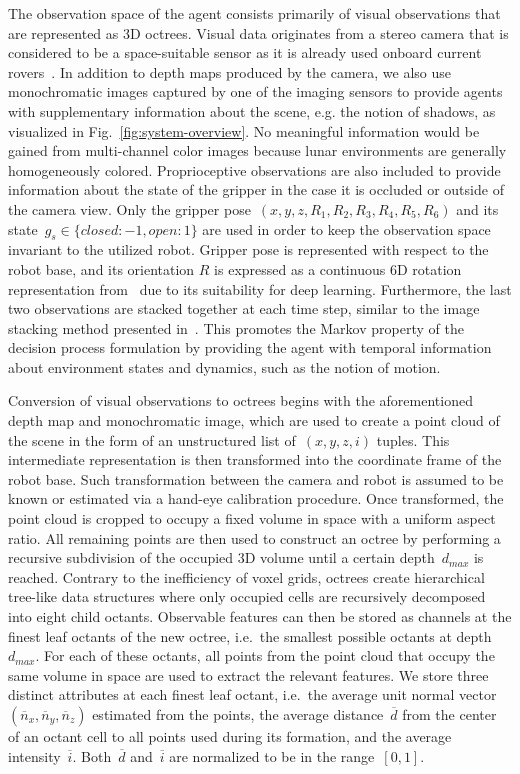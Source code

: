 The observation space of the agent consists primarily of visual observations that are represented as 3D octrees. Visual data originates from a stereo camera that is considered to be a space-suitable sensor as it is already used onboard current rovers~\cite{grotzinger_mars_2012}. In addition to depth maps produced by the camera, we also use monochromatic images captured by one of the imaging sensors to provide agents with supplementary information about the scene, e.g. the notion of shadows, as visualized in Fig.~\ref{fig:system-overview}. No meaningful information would be gained from multi-channel color images because lunar environments are generally homogeneously colored. Proprioceptive observations are also included to provide information about the state of the gripper in the case it is occluded or outside of the camera view. Only the gripper pose~\mbox{\((x,y,z,R_{1},R_{2},R_{3},R_{4},R_{5},R_{6})\)} and its state~\mbox{\(g_{s}\!\in\!\{closed\!:-1,open\!:1\}\)} are used in order to keep the observation space invariant to the utilized robot. Gripper pose is represented with respect to the robot base, and its orientation \(R\) is expressed as a continuous 6D rotation representation from~\cite{zhou_continuity_2019} due to its suitability for deep learning. Furthermore, the last two observations are stacked together at each time step, similar to the image stacking method presented in~\cite{mnih_human-level_2015}. This promotes the Markov property of the decision process formulation by providing the agent with temporal information about environment states and dynamics, such as the notion of motion.

Conversion of visual observations to octrees begins with the aforementioned depth map and monochromatic image, which are used to create a point cloud of the scene in the form of an unstructured list of~\mbox{\((x,y,z,i)\)} tuples. This intermediate representation is then transformed into the coordinate frame of the robot base. Such transformation between the camera and robot is assumed to be known or estimated via a hand-eye calibration procedure. Once transformed, the point cloud is cropped to occupy a fixed volume in space with a uniform aspect ratio. All remaining points are then used to construct an octree by performing a recursive subdivision of the occupied 3D volume until a certain depth~\(d_{max}\) is reached. Contrary to the inefficiency of voxel grids, octrees create hierarchical tree-like data structures where only occupied cells are recursively decomposed into eight child octants. Observable features can then be stored as channels at the finest leaf octants of the new octree, i.e.~the smallest possible octants at depth~\(d_{max}\). For each of these octants, all points from the point cloud that occupy the same volume in space are used to extract the relevant features. We store three distinct attributes at each finest leaf octant, i.e.~the average unit normal vector~\mbox{\((\overline{n}_{x},\overline{n}_{y},\overline{n}_{z})\)} estimated from the points, the average distance~\(\overline{d}\) from the center of an octant cell to all points used during its formation, and the average intensity~\(\overline{i}\). Both~\(\overline{d}\) and~\(\overline{i}\) are normalized to be in the range~\([0,1]\).

